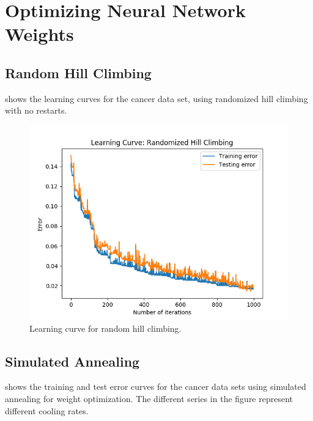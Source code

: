 \documentclass{article}
\begin{document}
  \section{Optimizing Neural Network Weights}

  \subsection{Random Hill Climbing}

   shows the learning curves for the cancer data set, using randomized hill climbing with no restarts.

  \begin{figure}[htb]
  \centering
  \includegraphics[width=.5\linewidth]{out/plot/RHC.png}
  \caption{Learning curve for random hill climbing.}
  \label{fig:rhc-learning}
  \end{figure}

  \subsection{Simulated Annealing}

   shows the training and test error curves for the cancer data sets using simulated annealing for weight optimization. The different series in the figure represent different cooling rates.
\end{document}
